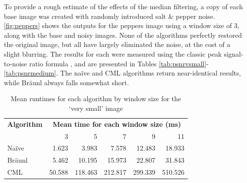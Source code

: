 
To provide a rough estimate of the effects of the median filtering, a copy of each base image was created with randomly introduced salt \& pepper noise.  \autoref{fig:peppers} shows the outputs for the peppers image using a window size of 3, along with the base and noisy images.  None of the algorithms perfectly restored the original image, but all have largely eliminated the noise, at the cost of a slight blurring.  The results for each were measured using the classic peak signal-to-noise ratio formula \cite{Boncelet2005}, and are presented in Tables \ref{tab:psnrvsmall}-\ref{tab:psnrmedium}.  The naïve and CML algorithms return near-identical results, while Bräunl always falls somewhat short.  %

\begin{table}
\centering
\caption{Mean runtimes for each algorithm by window size for the `very small' image}
\label{tab:verysmall}
\begin{tabular}{@{}lrrrrr@{}}
\toprule
\multicolumn{1}{c}{\textbf{Algorithm}} & \multicolumn{5}{c}{\textbf{Mean time for each window size (ms)}} \\
                              & 3        & 5         & 7         & 9         & 11       \\ \midrule
Naïve                         & 1.623    & 3.983     & 7.578     & 12.483    & 18.933   \\
Bräunl                        & 5.462    & 10.195    & 15.973    & 22.807    & 31.843   \\
CML                           & 50.588   & 118.463   & 212.817   & 299.339   & 510.526  \\ \bottomrule
\end{tabular}
\end{table}

